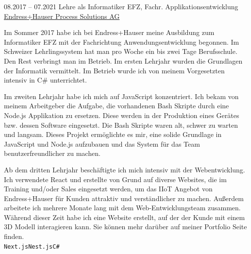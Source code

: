 \documentclass[9pt]{developercv} %
\begin{document}



\begin{entrylist}
	\entry
		{08.2017 -- 07.2021}
		{Lehre als Informatiker EFZ, Fachr. Applikationsentwicklung}
		{\href{https://endress.com}{Endress+Hauser Process Solutions AG}}
		{Im Sommer 2017 habe ich bei Endress+Hauser meine Ausbildung zum Informatiker EFZ mit der Fachrichtung Anwendungsentwicklung begonnen. Im Schweizer Lehrlingssystem hat man pro Woche ein bis zwei Tage Berufsschule. Den Rest verbringt man im Betrieb. Im ersten Lehrjahr wurden die Grundlagen der Informatik vermittelt. Im Betrieb wurde ich von meinem Vorgesetzten intensiv in C\# unterrichtet.

    Im zweiten Lehrjahr habe ich mich auf JavaScript konzentriert. Ich bekam von meinem Arbeitgeber die Aufgabe, die vorhandenen Bash Skripte durch eine Node.js Applikation zu ersetzen. Diese werden in der Produktion eines Gerätes bzw. dessen Software eingesetzt. Die Bash Skripte waren alt, schwer zu warten und langsam. Dieses Projekt ermöglichte es mir, eine solide Grundlage in JavaScript und Node.js aufzubauen und das System für das Team benutzerfreundlicher zu machen.
    
    Ab dem dritten Lehrjahr beschäftigte ich mich intensiv mit der Webentwicklung. Ich verwendete React und erstellte von Grund auf diverse Websites, die im Training und/oder Sales eingesetzt werden, um das IIoT Angebot von Endress+Hauser für Kunden attraktiv und verständlicher zu machen. Außerdem arbeitete ich mehrere Monate lang mit dem Web-Entwicklungsteam zusammen. Während dieser Zeit habe ich eine Website erstellt, auf der der Kunde mit einem 3D Modell interagieren kann. Sie können mehr darüber auf meiner Portfolio Seite finden.\\ \texttt{Next.js}\slashsep\texttt{Nest.js}\slashsep\texttt{C\#}}
\end{entrylist}
\end{document}

